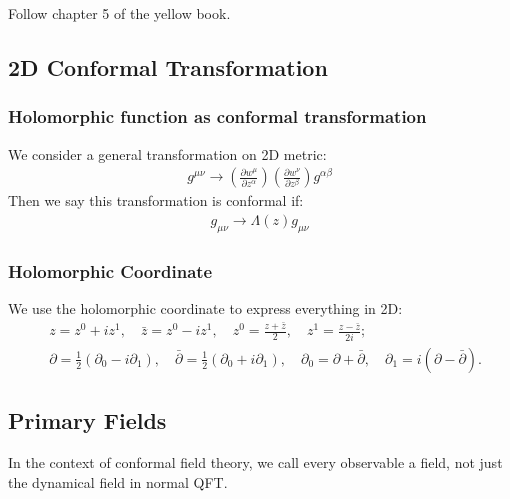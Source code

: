 Follow chapter 5 of the yellow book.

\subsection{2D Conformal Transformation}

\subsubsection{Holomorphic function as conformal transformation}

We consider a general transformation on 2D metric:
\begin{align}
  g^{\mu\nu}\to\left(\frac{\partial w^\mu}{\partial z^\alpha}\right)\left(\frac{\partial w^\nu}{\partial z^\beta}\right)g^{\alpha\beta}
\end{align}
Then we say this transformation is conformal if:
\begin{align}
  g_{\mu\nu}\to\Lambda(z)g_{\mu\nu}
\end{align}


\subsubsection{Holomorphic Coordinate}

We use the holomorphic coordinate to express everything in 2D:
\begin{align}
  & z = z^0 + i z^1, \quad \bar{z} = z^0 - i z^1, \quad z^0 = \frac{z + \bar{z}}{2}, \quad z^1 = \frac{z - \bar{z}}{2i};\\
& \partial = \frac{1}{2} (\partial_0 - i \partial_1), \quad 
\bar{\partial} = \frac{1}{2} (\partial_0 + i \partial_1), \quad \partial_0 = \partial + \bar{\partial}, \quad 
\partial_1 = i (\partial - \bar{\partial}).
\end{align}

\subsection{Primary Fields}

In the context of conformal field theory, we call every observable a field, not just the dynamical field in normal QFT.

